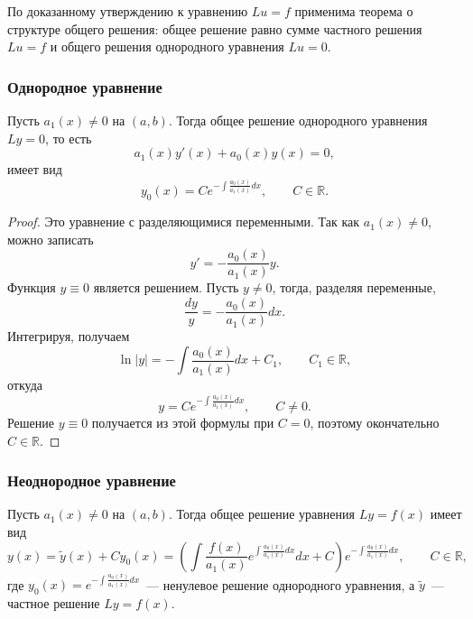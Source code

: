 \documentclass[12pt]{article}
\begin{document}
    \begin{note}
    	По доказанному утверждению к уравнению $Lu = f$ применима теорема о структуре общего решения: общее решение равно сумме частного решения $Lu = f$ и общего решения однородного уравнения $Lu = 0$.
    \end{note}
    
    \subsubsection{Однородное уравнение}
    
    \begin{statement}
    	Пусть $a_1(x) \ne 0$ на $(a, b)$. Тогда общее решение однородного уравнения $Ly = 0$, то есть
    	\[
    		a_1(x) y'(x) + a_0(x) y(x) = 0,
    	\]
    	имеет вид
    	\[
    		y_0(x) = C e^{-\int \frac{a_0(x)}{a_1(x)} dx}, \qquad C \in \mathbb{R}.
    	\]
    \end{statement}
    
    \begin{proof}
    	Это уравнение с разделяющимися переменными. Так как $a_1(x) \ne 0$, можно записать
    	\[
    		y' = -\dfrac{a_0(x)}{a_1(x)} y.
    	\]
    	Функция $y \equiv 0$ является решением. Пусть $y \ne 0$, тогда, разделяя переменные,
    	\[
    		\dfrac{dy}{y} = -\dfrac{a_0(x)}{a_1(x)} dx.
    	\]
    	Интегрируя, получаем
    	\[
    		\ln |y| = -\int \dfrac{a_0(x)}{a_1(x)} dx + C_1, \qquad C_1 \in \mathbb{R},
    	\]
    	откуда
    	\[
    		y = C e^{-\int \frac{a_0(x)}{a_1(x)} dx}, \qquad C \ne 0.
    	\]
    	Решение $y \equiv 0$ получается из этой формулы при $C = 0$, поэтому окончательно $C \in \mathbb{R}$.
    \end{proof}
    
    \subsubsection{Неоднородное уравнение}
    
    \begin{statement}
    	Пусть $a_1(x) \ne 0$ на $(a, b)$. Тогда общее решение уравнения $Ly = f(x)$ имеет вид
    	\[
    		y(x) = \widetilde{y}(x) + C y_0(x) = \left( \int \dfrac{f(x)}{a_1(x)} e^{\int \frac{a_0(x)}{a_1(x)} dx} dx + C \right) e^{-\int \frac{a_0(x)}{a_1(x)} dx}, \qquad C \in \mathbb{R},
    	\]
    	где $y_0(x) = e^{-\int \frac{a_0(x)}{a_1(x)} dx}$~--- ненулевое решение однородного уравнения, а $\widetilde{y}$~--- частное решение $Ly = f(x)$.
    \end{statement}
    
\end{document}
